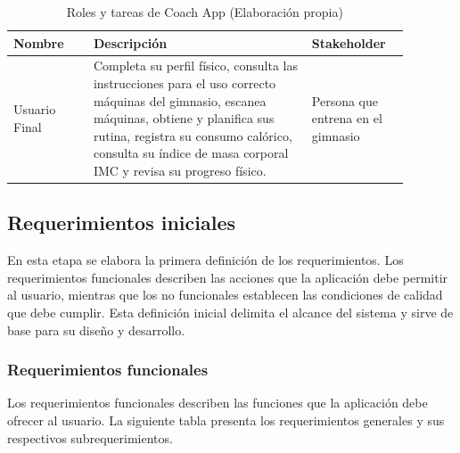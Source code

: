 \begin{table}[htbp]
\centering
\begin{tabular}{|p{0.18\linewidth}|p{0.49\linewidth}|p{0.21\linewidth}|}
  \hline
  \textbf{Nombre} & \textbf{Descripción} & \textbf{Stakeholder} \\
  \hline
  Usuario Final & 
  Completa su perfil físico, consulta las instrucciones para el uso correcto
  máquinas del gimnasio, escanea máquinas, obtiene y planifica sus rutina, registra 
  su consumo calórico, consulta su índice de masa corporal IMC y revisa su progreso físico. & 
  Persona que entrena en el gimnasio\\
  \hline
  \end{tabular}
  \caption{Roles y tareas de Coach App (Elaboración propia)}
  \label{tab:roles-tareas}
\end{table}


\subsection{Requerimientos iniciales} 

En esta etapa se elabora la primera definición de los requerimientos. Los requerimientos 
funcionales describen las acciones que la aplicación debe permitir al usuario, mientras que
los no funcionales establecen las condiciones de calidad que debe cumplir.
Esta definición inicial delimita el alcance del sistema y sirve de base para su diseño y desarrollo.

\subsubsection{Requerimientos funcionales}

Los requerimientos funcionales describen las funciones que la aplicación debe ofrecer al usuario. 
La siguiente tabla presenta los requerimientos generales y sus respectivos subrequerimientos.

